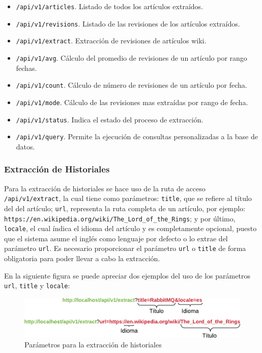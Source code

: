 \begin{itemize}
	\item \texttt{/api/v1/articles}. Listado de todos los artículos extraídos.
	\item \texttt{/api/v1/revisions}. Listado de las revisiones de los artículos extraídos.
	\item \texttt{/api/v1/extract}. Extracción de revisiones de artículos wiki.
	\item \texttt{/api/v1/avg}. Cálculo del promedio de revisiones de un artículo por rango fechas.
	\item \texttt{/api/v1/count}. Cálculo de número de revisiones de un artículo por fecha.
	\item \texttt{/api/v1/mode}. Cálculo de las revisiones mas extraídas por rango de fecha.
	\item \texttt{/api/v1/status}. Indica el estado del proceso de extracción.
	\item \texttt{/api/v1/query}. Permite la ejecución de consultas personalizadas a la base de datos.
\end{itemize}

\subsubsection{Extracción de Historiales}

Para la extracción de historiales se hace uso de la ruta de acceso \texttt{/api/v1/extract}, la cual
tiene como parámetros:
\texttt{title}, que se refiere al título del del artículo; \texttt{url}, representa la ruta completa de un artículo, por ejemplo:
\texttt{https://en.wikipedia.org/wiki/The\_Lord\_of\_the\_Rings}; y por último, \texttt{locale}, el cual índica el idioma del artículo y
es completamente opcional, puesto que el sistema asume el inglés como lenguaje por defecto o lo extrae del parámetro
\texttt{url}.
Es necesario proporcionar el parámetro \texttt{url} o \texttt{title} de forma obligatoria para poder llevar a cabo la extracción.

En la siguiente figura se puede apreciar dos ejemplos del uso de los parámetros \texttt{url}, \texttt{title} y \texttt{locale}:

\begin{figure}[H]
	\centering
		\includegraphics[width=1\textwidth]{figures/extract_url_format}
	\caption{Parámetros para la extracción de historiales}
	\label{fig:extract_url_format}
\end{figure}

